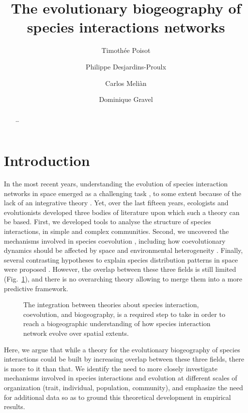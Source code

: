 \documentclass[11pt,oneside]{article}
\title{The evolutionary biogeography of species interactions networks}
\author{Timoth\'ee Poisot \and Philippe Desjardins-Proulx \and Carlos Meli\`an \and Dominique Gravel}
\begin{document}
\maketitle
\begin{abstract}
	\ldots 
\end{abstract}
\onehalfspacing\clearpage


\section{Introduction}

In the most recent years, understanding the evolution of species interaction
networks in space emerged as a challenging task \parencite{Pillai2011}, to some
extent because of the lack of an integrative theory \parencite{Urban2008}. Yet,
over the last fifteen years, ecologists and evolutionists developed three bodies
of literature upon which such a theory can be based. First, we developed tools
to analyse the structure of species interactions, in simple and complex
communities. Second, we uncovered the mechanisms involved in species coevolution
\parencite{Thompson1994a}, including how coevolutionary dynamics should be
affected by space and environmental heterogeneity \parencite{Thompson2005}.
Finally, several contrasting hypotheses to explain species distribution
patterns in space were proposed \parencite{O'Dwyer2010}. However, the overlap
between these three fields is still limited (Fig.~\ref{f:venn}), and there is
no overarching theory allowing to merge them into a more predictive framework.

\begin{figure}[htbp]
   \centering
   
   \caption{The integration between theories about species interaction,
   coevolution, and biogeography, is a required step to take in order to reach
   a biogeographic understanding of how species interaction network evolve
   over spatial extents.}
   \label{f:venn}
\end{figure}

Here, we argue that while a theory for the evolutionary biogeography of
species interactions could be built by increasing overlap between these three
fields, there is more to it than that. We identify the need to more closely
investigate mechanisms involved in species interactions and evolution at
different scales of organization (trait, individual, population, community),
and emphasize the need for additional data so as to ground this theoretical
development in empirical results.
\end{document}
